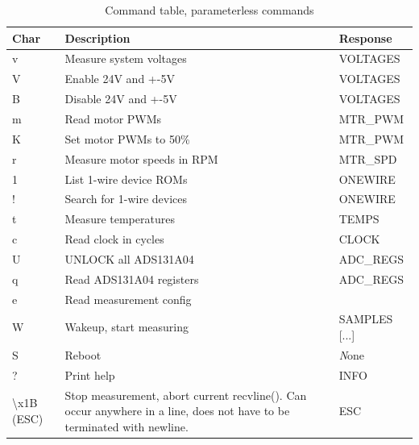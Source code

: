 \documentclass{article}
\begin{document}

\begin{table}[H]
\begin{centering}
\begin{tabular}{|p{1.0cm}|p{7.8cm}|p{2.0cm}|}
\hline
{\bf Char} & {\bf Description}    & {\bf Response}\\ \hline
v & Measure system voltages       & VOLTAGES      \\ \hline
V & Enable 24V and +-5V           & VOLTAGES      \\ \hline
B & Disable 24V and +-5V          & VOLTAGES      \\ \hline
m & Read motor PWMs               & MTR\_PWM      \\ \hline
K & Set motor PWMs to 50\%        & MTR\_PWM      \\ \hline
r & Measure motor speeds in RPM   & MTR\_SPD      \\ \hline
1 & List 1-wire device ROMs       & ONEWIRE       \\ \hline
! & Search for 1-wire devices     & ONEWIRE       \\ \hline
t & Measure temperatures          & TEMPS         \\ \hline
c & Read clock in cycles          & CLOCK         \\ \hline
U & UNLOCK all ADS131A04          & ADC\_REGS     \\ \hline
q & Read ADS131A04 registers      & ADC\_REGS     \\ \hline
e & Read measurement config       &               \\ \hline
W & Wakeup, start measuring       & SAMPLES [...] \\ \hline
S & Reboot                        & {\emph None}  \\ \hline
? & Print help                    & INFO          \\ \hline
{\textbackslash}x1B (ESC)  &   Stop measurement, abort current recvline().
Can occur anywhere in a line, does not have to be terminated with newline. & ESC \\ \hline
\end{tabular}
\caption{Command table, parameterless commands}
\label{command_table_0}
\end{centering}
\end{table}
\end{document}

